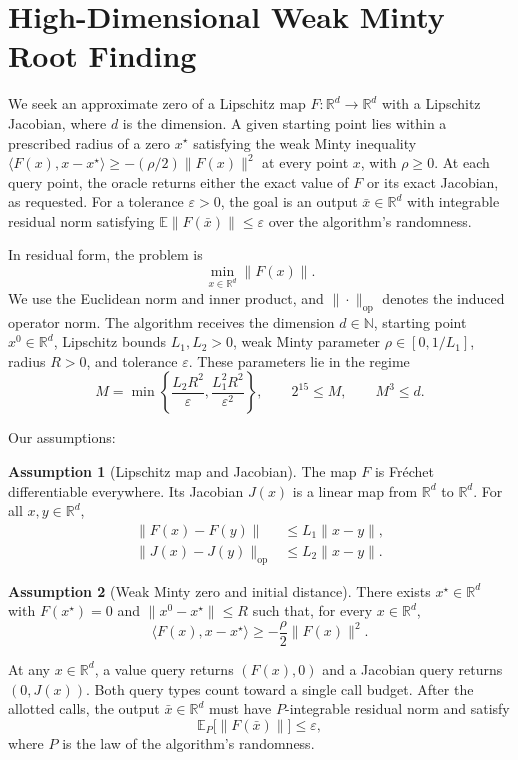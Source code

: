 \documentclass[10pt]{article}
\theoremstyle{definition}
\newtheorem{assumption}{Assumption}
\begin{document}
\section*{High-Dimensional Weak Minty Root Finding}
We seek an approximate zero of a Lipschitz map $F:\mathbb{R}^d\to\mathbb{R}^d$ with a Lipschitz Jacobian, where $d$ is the dimension. A given starting point lies within a prescribed radius of a zero $x^\star$ satisfying the weak Minty inequality $\langle F(x),x-x^\star\rangle\geq-(\rho/2)\|F(x)\|^2$ at every point $x$, with $\rho\geq0$. At each query point, the oracle returns either the exact value of $F$ or its exact Jacobian, as requested. For a tolerance $\varepsilon>0$, the goal is an output $\bar{x}\in\mathbb{R}^d$ with integrable residual norm satisfying $\mathbb{E}\|F(\bar{x})\|\leq\varepsilon$ over the algorithm's randomness.

In residual form, the problem is
\[
\min_{x\in\mathbb{R}^d}\|F(x)\|.
\]
We use the Euclidean norm and inner product, and $\|\cdot\|_{\mathrm{op}}$ denotes the induced operator norm. The algorithm receives the dimension $d\in\mathbb{N}$, starting point $x^0\in\mathbb{R}^d$, Lipschitz bounds $L_1,L_2>0$, weak Minty parameter $\rho\in[0,1/L_1]$, radius $R>0$, and tolerance $\varepsilon$. These parameters lie in the regime
\[
M=\min\left\{\frac{L_2R^2}{\varepsilon},\frac{L_1^2R^2}{\varepsilon^2}\right\},
\qquad 2^{15}\leq M,
\qquad M^3\leq d.
\]

Our assumptions:
\begin{assumption}[Lipschitz map and Jacobian]
The map $F$ is Fr\'echet differentiable everywhere. Its Jacobian $J(x)$ is a linear map from $\mathbb{R}^d$ to $\mathbb{R}^d$. For all $x,y\in\mathbb{R}^d$,
\[
\begin{aligned}
\|F(x)-F(y)\| &\leq L_1\|x-y\|,\\
\|J(x)-J(y)\|_{\mathrm{op}} &\leq L_2\|x-y\|.
\end{aligned}
\]
\end{assumption}

\begin{assumption}[Weak Minty zero and initial distance]
There exists $x^\star\in\mathbb{R}^d$ with $F(x^\star)=0$ and $\|x^0-x^\star\|\leq R$ such that, for every $x\in\mathbb{R}^d$,
\[
\langle F(x),x-x^\star\rangle\geq-\frac{\rho}{2}\|F(x)\|^2.
\]
\end{assumption}

At any $x\in\mathbb{R}^d$, a value query returns $(F(x),0)$ and a Jacobian query returns $(0,J(x))$. Both query types count toward a single call budget. After the allotted calls, the output $\bar{x}\in\mathbb{R}^d$ must have $P$-integrable residual norm and satisfy
\[
\mathbb{E}_{P}\bigl[\|F(\bar{x})\|\bigr]\leq\varepsilon,
\]
where $P$ is the law of the algorithm's randomness.
\end{document}
